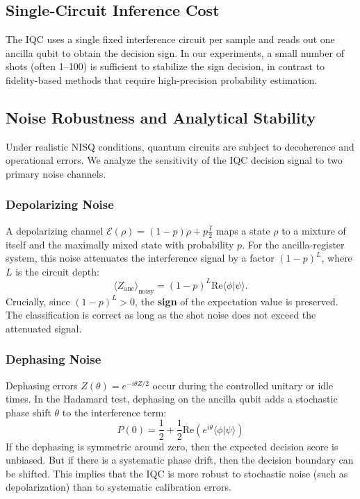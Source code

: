 \documentclass[conference]{IEEEtran}
\begin{document}
\subsection{Single-Circuit Inference Cost}

The IQC uses a single fixed interference circuit per sample and reads out one ancilla qubit to obtain the decision sign. In our experiments, a small number of shots (often 1--100) is sufficient to stabilize the sign decision, in contrast to fidelity-based methods that require high-precision probability estimation.

\subsection{Noise Robustness and Analytical Stability}

Under realistic NISQ conditions, quantum circuits are subject to decoherence and operational errors. We analyze the sensitivity of the IQC decision signal to two primary noise channels.

\subsubsection{Depolarizing Noise}
A depolarizing channel $\mathcal{E}(\rho) = (1-p)\rho + p\frac{I}{2}$ maps a state $\rho$ to a mixture of itself and the maximally mixed state with probability $p$. For the ancilla-register system, this noise attenuates the interference signal by a factor $(1-p)^L$, where $L$ is the circuit depth:
\begin{equation}
    \langle Z_{\text{anc}} \rangle_{\text{noisy}} = (1-p)^L \mathrm{Re}\langle \phi | \psi \rangle.
\end{equation}
Crucially, since $(1-p)^L > 0$, the \textbf{sign} of the expectation value is preserved. The classification is correct as long as the shot noise does not exceed the attenuated signal.

\subsubsection{Dephasing Noise}
Dephasing errors $Z(\theta) = e^{-i\theta Z/2}$ occur during the controlled unitary or idle times. In the Hadamard test, dephasing on the ancilla qubit adds a stochastic phase shift $\theta$ to the interference term:
\begin{equation}
    P(0) = \frac{1}{2} + \frac{1}{2} \text{Re}(e^{i\theta} \langle \phi | \psi \rangle)
\end{equation}
If the dephasing is symmetric around zero, then the expected decision score is unbiased. But if there is a systematic phase drift, then the decision boundary can be shifted. This implies that the IQC is more robust to stochastic noise (such as depolarization) than to systematic calibration errors.
\end{document}
